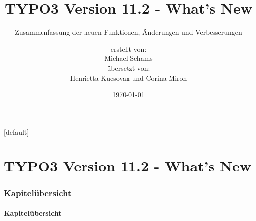 \documentclass[t]{beamer}
\title{TYPO3 Version 11.2 - What's New}
\subtitle{Zusammenfassung der neuen Funktionen, Änderungen und Verbesserungen}
\author{
	\centerline{erstellt von:}
	\centerline{Michael Schams}
	\centerline{übersetzt von:}
	\centerline{Henrietta Kucsovan und Corina Miron}
}
\date{\today}
\begin{document}
\sharefont


\begingroup
	[default]
	\begin{frame}
		\titlepage
	\end{frame}
\endgroup


\section*{TYPO3 Version 11.2 - What's New}
\begin{frame}[fragile]
	\frametitle{Kapitelübersicht}
	\framesubtitle{Kapitelübersicht}

	\tableofcontents

\end{frame}















\end{document}
